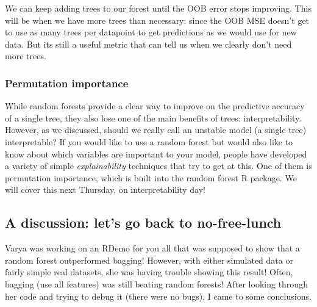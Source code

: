 We can keep adding trees to our forest until the OOB error stops improving. This will be when we have more trees than necessary: since the OOB MSE doesn't get to use as many trees per datapoint to get predictions as we would use for new data. But its still a useful metric that can tell us when we clearly don't need more trees. 

\subsubsection{Permutation importance}

While random forests provide a clear way to improve on the predictive accuracy of a single tree, they also lose one of the main benefits of trees: interpretability. However, as we discussed, should we really call an unstable model (a single tree) interpretable? If you would like to use a random forest but would also like to know about which variables are important to your model, people have developed a variety of simple \emph{explainability} techniques that try to get at this. One of them is permutation importance, which is built into the random forest R package. We will cover this next Thursday, on interpretability day!


\subsection{A discussion: let's go back to no-free-lunch}

Varya was working on an RDemo for you all that was supposed to show that a random forest outperformed bagging! However, with either simulated data or fairly simple real datasets, she was having trouble showing this result! Often, bagging (use all features) was still beating random forests! After looking through her code and trying to debug it (there were no bugs), I came to some conclusions. 

